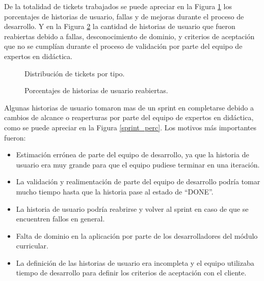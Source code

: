 De la totalidad de tickets trabajados se puede apreciar en la Figura \ref{tickets_by_type} los porcentajes de historias de usuario, fallas y de mejoras durante el proceso de desarrollo. Y en la Figura \ref{user_story_perc} la cantidad de historias de usuario que fueron reabiertas debido a fallas, desconocimiento de dominio, y criterios de aceptación que no se cumplían durante el proceso de validación por parte del equipo de expertos en didáctica.

\begin{figure}[H]
\centering
{}
\caption{Distribución de tickets por tipo.}
  \label{tickets_by_type}
\end{figure}

\begin{figure}[H]
\centering
{}
\caption{Porcentajes de historias de usuario reabiertas.}
  \label{user_story_perc}
\end{figure}

Algunas historias de usuario tomaron mas de un sprint en completarse debido a cambios de alcance o reaperturas por parte del equipo de expertos en didáctica, como se puede apreciar en la Figura \ref{sprint_perc}. Los motivos más importantes fueron:
\begin{itemize}
    \item Estimación errónea de parte del equipo de desarrollo, ya que la historia de usuario era muy grande para que el equipo pudiese terminar en una iteración.
    \item La validación y realimentación de parte del equipo de desarrollo podría tomar mucho tiempo hasta que la historia pase al estado de \enquote{DONE}.
    \item La historia de usuario podría reabrirse y volver al sprint en caso de que se encuentren fallos en general.
    \item Falta de dominio en la aplicación por parte de los desarrolladores del módulo curricular.
    \item La definición de las historias de usuario era incompleta y el equipo utilizaba tiempo de desarrollo para definir los criterios de aceptación con el cliente.
\end{itemize}

